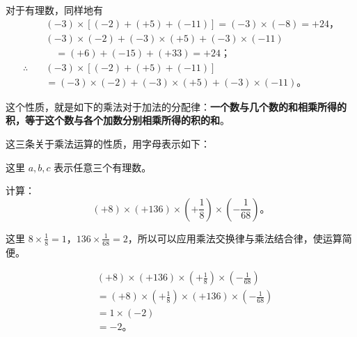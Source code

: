 对于有理数，同样地有
\begin{align*}
&(-3) \times [(-2) + (+5) + (-11)] = (-3) \times (-8) = +24， \\
&(-3) \times (-2) + (-3) \times (+5) + (-3) \times (-11) \\
&\quad = (+6) + (-15) + (+33) = +24； \\
\therefore\quad & (-3) \times [(-2) + (+5) + (-11)] \\
&= (-3) \times (-2) + (-3) \times (+5) + (-3) \times (-11)。
\end{align*}

这个性质，就是如下的乘法对于加法的分配律：\textbf{一个数与几个数的和相乘所得的积，等于这个数与各个加数分别相乘所得的积的和}。

这三条关于乘法运算的性质，用字母表示如下：

\begin{center}
\end{center}

这里 $a, b, c$ 表示任意三个有理数。

 计算：
\[
(+8) \times (+136) \times \left(+\frac{1}{8}\right) \times \left(-\frac{1}{68}\right)。
\]

 这里 $8 \times \frac{1}{8} = 1$，$136 \times \frac{1}{68} = 2$，所以可以应用乘法交换律与乘法结合律，使运算简便。

\begin{align*}
&(+8) \times (+136) \times \left(+\frac{1}{8}\right) \times \left(-\frac{1}{68}\right) \\
&= (+8) \times \left(+\frac{1}{8}\right) \times (+136) \times \left(-\frac{1}{68}\right) \\
&= 1 \times (-2) \\
&= -2。
\end{align*}

